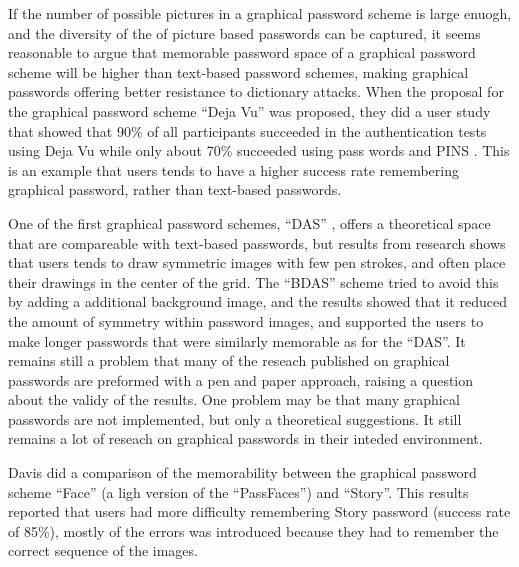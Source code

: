   If the number of possible pictures in a graphical password scheme is large enuogh, and the diversity of the of picture based passwords can be captured, it seems reasonable to argue that memorable password space of a graphical password scheme will be higher than text-based password schemes, making graphical passwords offering better resistance to dictionary attacks.
  When the proposal for the graphical password scheme ``Deja Vu'' was proposed, they did a user study that showed that 90\% of all participants succeeded in the authentication tests using Deja Vu while only about 70\% succeeded using pass words and PINS \cite{DejaVu}. This is an example that users tends to have a higher success rate remembering graphical password, rather than text-based passwords. 

  One of the first graphical password schemes, ``DAS'' \cite{Jermyn}, offers a theoretical space that are compareable with text-based passwords, but results from research shows that users tends to draw symmetric images with few pen strokes, and often place their drawings in the center of the grid. The ``BDAS'' scheme \cite{BDAS} tried to avoid this by adding a additional background image, and the results showed that it reduced the amount of symmetry within password images, and supported the users to make longer passwords that were similarly memorable as for the ``DAS''. It remains still a problem that many of the reseach published on graphical passwords are preformed with a pen and paper approach, raising a question about the validy of the results. One problem may be that many graphical passwords are not implemented, but only a theoretical suggestions. It still remains a lot of reseach on graphical passwords in their inteded environment. 

  Davis \cite{Davis} did a comparison of the memorability between the graphical password scheme ``Face'' (a ligh version of the ``PassFaces'') and ``Story''. This results reported that users had more difficulty remembering Story password (success rate of 85\%), mostly of the errors was introduced because they had to remember the correct sequence of the images. 

